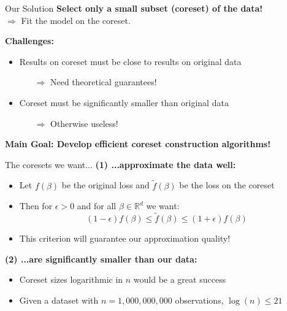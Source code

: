 \documentclass[gray]{beamer}
\begin{document}
\begin{frame}{Our Solution}
    \textbf{Select only a small subset (coreset) of the data!} \\
    $\Rightarrow$ Fit the model on the coreset.

    \vspace{\fill}

    \textbf{Challenges:}
    \begin{itemize}
        \item Results on coreset must be close to results on original data
              \begin{itemize}
                  \item[$\Rightarrow$] Need theoretical guarantees!
              \end{itemize}
        \item Coreset must be significantly smaller than original data
              \begin{itemize}
                  \item[$\Rightarrow$] Otherwise useless!
              \end{itemize}
    \end{itemize}

    \vspace{\fill}

    \textbf{Main Goal: Develop efficient coreset construction algorithms!}
\end{frame}

\begin{frame}{The coresets we want...}
    \textbf{(1) ...approximate the data well:}
    \begin{itemize}
        \item Let $f(\beta)$ be the original loss and $\tilde{f}(\beta)$
              be the loss on the coreset
        \item Then for $\epsilon > 0$ and for all $\beta \in \mathbb{R}^d$ we want:
              \begin{equation*}
                  (1 - \epsilon) f(\beta) \leq \tilde{f}(\beta) \leq (1 + \epsilon) f(\beta)
              \end{equation*}
        \item This criterion will guarantee our approximation quality!
    \end{itemize}

    \vspace{\fill}

    \textbf{(2) ...are significantly smaller than our data:}
    \begin{itemize}
        \item Coreset sizes logarithmic in $n$ would be a great success
        \item Given a dataset with $n=1,000,000,000$ observations,
              $\log(n) \leq 21$
    \end{itemize}
\end{frame}
\end{document}

